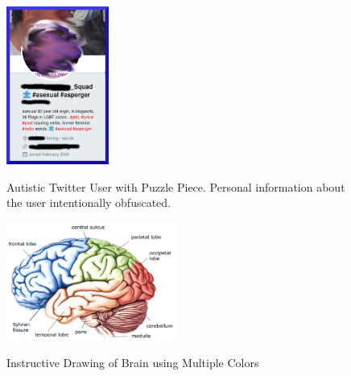 \begin{figure}[ht]
\caption[Twitter User with Puzzle Piece Emoji]{Autistic Twitter User with Puzzle Piece. Personal information about the user intentionally obfuscated.}
\centering
\includegraphics[width=0.3\textwidth]{covfefe.png}
\label{fig:covfefe}
\end{figure}

\begin{figure}[ht]
\caption{Instructive Drawing of Brain using Multiple Colors}
\centering
\includegraphics[width=0.5\textwidth]{brainparts.png}
\label{fig:brainparts}
\end{figure}

